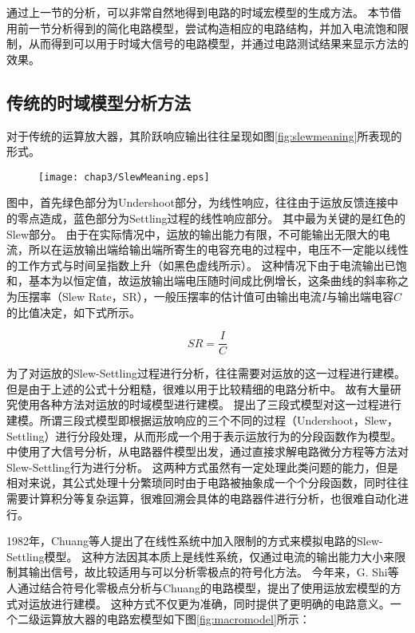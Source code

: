 通过上一节的分析，可以非常自然地得到电路的时域宏模型的生成方法。
本节借用前一节分析得到的简化电路模型，尝试构造相应的电路结构，并加入电流饱和限制，从而得到可以用于时域大信号的电路模型，并通过电路测试结果来显示方法的效果。

\subsection{传统的时域模型分析方法}

对于传统的运算放大器，其阶跃响应输出往往呈现如图\ref{fig:slewmeaning}所表现的形式。

\begin{figure}[!htp]
	\centering
	\texttt{[image: chap3/SlewMeaning.eps]}
\end{figure}

图中，首先绿色部分为Undershoot部分，为线性响应，往往由于运放反馈连接中的零点造成，蓝色部分为Settling过程的线性响应部分。
其中最为关键的是红色的Slew部分。
由于在实际情况中，运放的输出能力有限，不可能输出无限大的电流，所以在运放输出端给输出端所寄生的电容充电的过程中，电压不一定能以线性的工作方式与时间呈指数上升（如黑色虚线所示）。
这种情况下由于电流输出已饱和，基本为以恒定值，故运放输出端电压随时间成比例增长，这条曲线的斜率称之为压摆率（Slew Rate，SR），一般压摆率的估计值可由输出电流$I$与输出端电容$C$的比值决定，如下式所示。

\begin{equation}
SR = \frac{I}{C}
\end{equation}

为了对运放的Slew-Settling过程进行分析，往往需要对运放的这一过程进行建模。
但是由于上述的公式十分粗糙，很难以用于比较精细的电路分析中。
故有大量研究使用各种方法对运放的时域模型进行建模。
\parencite{Pug-3Segment-2010}提出了三段式模型对这一过程进行建模。所谓三段式模型即根据运放响应的三个不同的过程（Undershoot，Slew，Settling）进行分段处理，从而形成一个用于表示运放行为的分段函数作为模型。
\parencite{Yavari-TSSlew-2005,Rezaee-FCSlew-2009}中使用了大信号分析，从电路器件模型出发，通过直接求解电路微分方程等方法对Slew-Settling行为进行分析。
这两种方式虽然有一定处理此类问题的能力，但是相对来说，其公式处理十分繁琐同时由于电路被抽象成一个个分段函数，同时往往需要计算积分等复杂运算，很难回溯会具体的电路器件进行分析，也很难自动化进行。

1982年，Chuang等人提出了在线性系统中加入限制的方式来模拟电路的Slew-Settling模型\parencite{Chuang-Slew-1982}。
这种方法因其本质上是线性系统，仅通过电流的输出能力大小来限制其输出信号，故比较适用与可以分析零极点的符号化方法。
今年来，G. Shi等人通过结合符号化零极点分析与Chuang的电路模型\parencite{ZhangHe-Slew-2011,ZhangAilin-Slew-2015}，提出了使用运放宏模型的方式对运放进行建模。
这种方式不仅更为准确，同时提供了更明确的电路意义。一个二级运算放大器的电路宏模型如下图\ref{fig:macromodel}所示：


